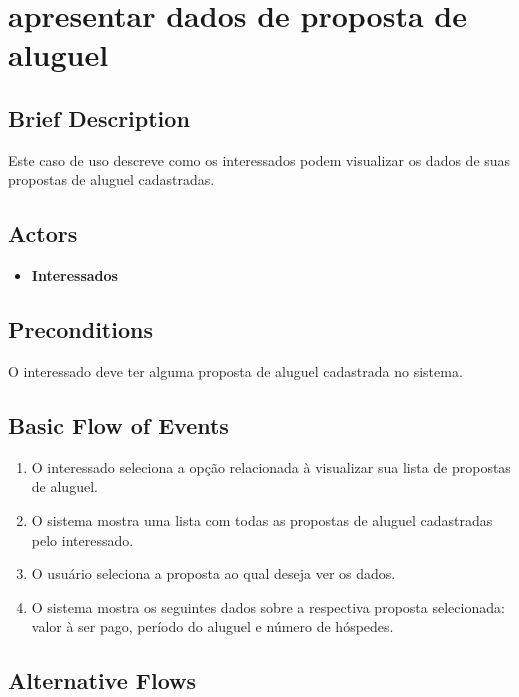\section{apresentar dados de proposta de aluguel}

\subsection*{Brief Description}
Este caso de uso descreve como os interessados podem visualizar os dados de
suas propostas de aluguel cadastradas.

\subsection*{Actors}

\begin{itemize}
    \item \textbf{Interessados}
\end{itemize}

\subsection*{Preconditions}
O interessado deve ter alguma proposta de aluguel cadastrada no sistema.

\subsection*{Basic Flow of Events}

\begin{enumerate}
    \item O interessado seleciona a opção relacionada à visualizar sua lista de propostas de aluguel.
    \item O sistema mostra uma lista com todas as propostas de aluguel cadastradas pelo
    interessado.
    \item  O usuário seleciona a proposta ao qual deseja ver os dados.
    \item  O sistema mostra os seguintes dados sobre a respectiva proposta selecionada: valor à
    ser pago, período do aluguel e número de hóspedes.
\end{enumerate}

\subsection*{Alternative Flows}

